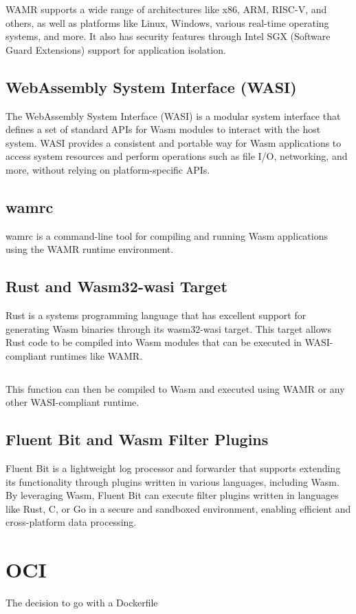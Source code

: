 WAMR supports a wide range of architectures like x86, ARM, RISC-V, and others, as well as platforms like Linux, Windows, various real-time operating systems, and more. It also has security features through Intel SGX (Software Guard Extensions) support for application isolation.

\subsection{WebAssembly System Interface (WASI)}
The WebAssembly System Interface (WASI) is a modular system interface that defines a set of standard APIs for Wasm modules to interact with the host system. WASI provides a consistent and portable way for Wasm applications to access system resources and perform operations such as file I/O, networking, and more, without relying on platform-specific APIs.

\subsection{wamrc}
wamrc is a command-line tool for compiling and running Wasm applications using the WAMR runtime environment.

\subsection{Rust and Wasm32-wasi Target}
Rust is a systems programming language that has excellent support for generating Wasm binaries through its wasm32-wasi target. This target allows Rust code to be compiled into Wasm modules that can be executed in WASI-compliant runtimes like WAMR.

\begin{verbatim}

\end{verbatim}

This function can then be compiled to Wasm and executed using WAMR or any other WASI-compliant runtime.

\subsection{Fluent Bit and Wasm Filter Plugins}
Fluent Bit is a lightweight log processor and forwarder that supports extending its functionality through plugins written in various languages, including Wasm. By leveraging Wasm, Fluent Bit can execute filter plugins written in languages like Rust, C, or Go in a secure and sandboxed environment, enabling efficient and cross-platform data processing.

\section{OCI}
The decision to go with a Dockerfile 